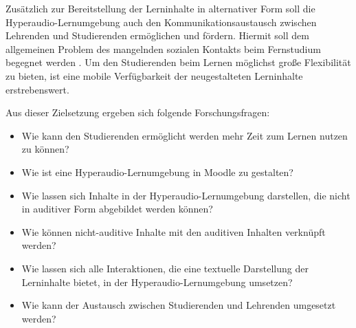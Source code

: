Zusätzlich zur Bereitstellung der Lerninhalte in alternativer Form soll die Hyperaudio-Lernumgebung auch den Kommunikationsaustausch zwischen Lehrenden und Studierenden ermöglichen und fördern. Hiermit soll dem allgemeinen Problem des mangelnden sozialen Kontakts beim Fernstudium begegnet werden \citep{kerres2002didaktische}. Um den Studierenden beim Lernen möglichst große Flexibilität zu bieten, ist eine mobile Verfügbarkeit der neugestalteten Lerninhalte erstrebenswert.

Aus dieser Zielsetzung ergeben sich folgende Forschungsfragen:

\begin{itemize}
\item Wie kann den Studierenden ermöglicht werden mehr Zeit zum Lernen nutzen zu können?
\item Wie ist eine Hyperaudio-Lernumgebung in Moodle zu gestalten?
\item Wie lassen sich Inhalte in der Hyperaudio-Lernumgebung darstellen, die nicht in auditiver Form abgebildet werden können?
\item Wie können nicht-auditive Inhalte mit den auditiven Inhalten verknüpft werden?
\item Wie lassen sich alle Interaktionen, die eine textuelle Darstellung der Lerninhalte bietet, in der Hyperaudio-Lernumgebung umsetzen?
\item Wie kann der Austausch zwischen Studierenden und Lehrenden umgesetzt werden?
\end{itemize}










